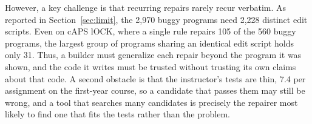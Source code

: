 \documentclass[acmsmall,screen,review,anonymous,nonacm]{acmart}
\begin{document}
However, a key challenge is that recurring repairs rarely recur verbatim. As reported in Section~\ref{sec:limit}, the 2{,}970 buggy programs need 2{,}228 distinct edit scripts. Even on cAPS lOCK, where a single rule repairs 105 of the 560 buggy programs, the largest group of programs sharing an identical edit script holds only 31. Thus, a builder must generalize each repair beyond the program it was shown, and the code it writes must be trusted without trusting its own claims about that code. A second obstacle is that the instructor's tests are thin, 7.4 per assignment on the first-year course, so a candidate that passes them may still be wrong, and a tool that searches many candidates is precisely the repairer most likely to find one that fits the tests rather than the problem.
\end{document}
